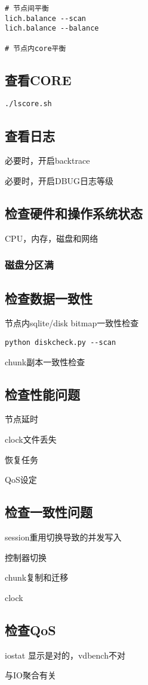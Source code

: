 \begin{lstlisting}
# 节点间平衡
lich.balance --scan
lich.balance --balance

# 节点内core平衡
\end{lstlisting}

\subsection{查看CORE}

\begin{lstlisting}
./lscore.sh
\end{lstlisting}

\subsection{查看日志}

必要时，开启backtrace

必要时，开启DBUG日志等级

\subsection{检查硬件和操作系统状态}

CPU，内存，磁盘和网络

\subsubsection{磁盘分区满}




\subsection{检查数据一致性}

节点内sqlite/disk bitmap一致性检查

\begin{lstlisting}
python diskcheck.py --scan
\end{lstlisting}

chunk副本一致性检查

\subsection{检查性能问题}

节点延时

clock文件丢失

恢复任务

QoS设定

\subsection{检查一致性问题}

session重用切换导致的并发写入

控制器切换

chunk复制和迁移

clock

\subsection{检查QoS}

iostat 显示是对的，vdbench不对

与IO聚合有关
